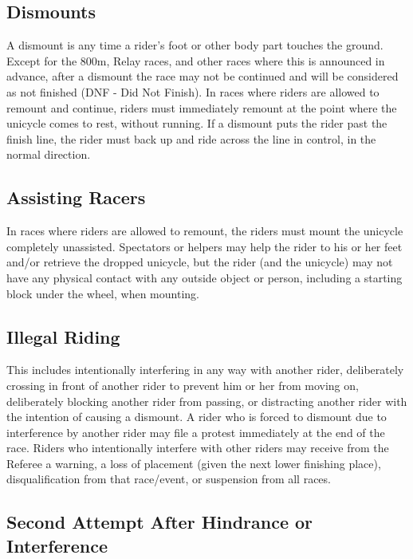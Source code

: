 \subsection{Dismounts}

A dismount is any time a rider's foot or other body part touches the ground.
Except for the 800m, Relay races, and other races where this is announced in advance, after a dismount the race may not be continued and will be considered as not finished (DNF - Did Not Finish).
In races where riders are allowed to remount and continue, riders must immediately remount at the point where the unicycle comes to rest, without running.
If a dismount puts the rider past the finish line, the rider must back up and ride across the line in control, in the normal direction.

\subsection{Assisting Racers}

In races where riders are allowed to remount, the riders must mount the unicycle completely unassisted.
Spectators or helpers may help the rider to his or her feet and/or retrieve the dropped unicycle, but the rider (and the unicycle) may not have any physical contact with any outside object or person, including a starting block under the wheel, when mounting.

\subsection{Illegal Riding}

This includes intentionally interfering in any way with another rider, deliberately crossing in front of another rider to prevent him or her from moving on, deliberately blocking another rider from passing, or distracting another rider with the intention of causing a dismount.
A rider who is forced to dismount due to interference by another rider may file a protest immediately at the end of the race.
Riders who intentionally interfere with other riders may receive from the Referee a warning, a loss of placement (given the next lower finishing place), disqualification from that race/event, or suspension from all races.

\subsection{Second Attempt After Hindrance or Interference}

